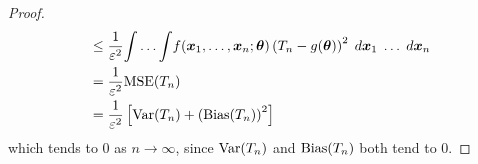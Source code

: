 \begin{proof}
\begin{align*}
         & \leq \frac{1}{\varepsilon^2} {\int \ldots \int} f(\bm{x}_1 , \ldots , \bm{x}_n ; \bm{\theta}) \left( T_n - g (\bm{\theta}) \right)^2 \; d \bm{x}_1 \; \ldots \; d \bm{x}_n                                                       \\
         & = \frac{1}{\varepsilon^2} {\operatorname{MSE}} (T_n)                                                                                                                                                                                             \\
         & = \frac{1}{\varepsilon^2} \left[ {\operatorname{Var}} (T_n) + \left( {\operatorname{Bias}} (T_n) \right)^2 \right]
    \end{align*}
    which tends to $0$ as $n \to \infty$, since ${\operatorname{Var}} (T_n)$ and ${\operatorname{Bias}} (T_n)$ both tend to $0$.
\end{proof}

